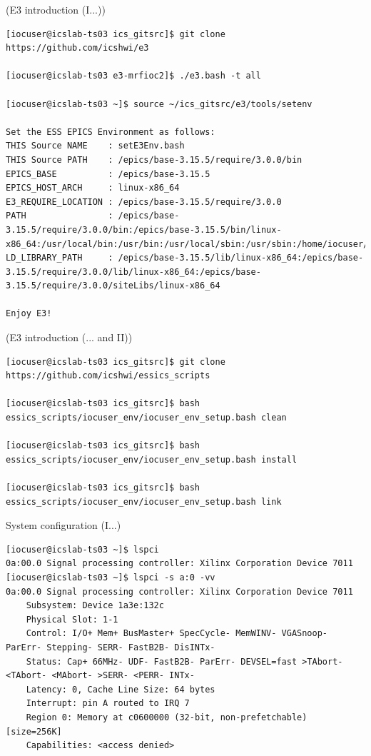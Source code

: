 \documentclass[
  9pt
  , table
  , ignorenonframetext
]{beamer}
\begin{document}
\begin{frame}[fragile]{(E3 introduction (I...))}
\begin{lstlisting}[style=termstyle,breaklines=true,basicstyle=\scriptsize]
[iocuser@icslab-ts03 ics_gitsrc]$ git clone https://github.com/icshwi/e3

[iocuser@icslab-ts03 e3-mrfioc2]$ ./e3.bash -t all

[iocuser@icslab-ts03 ~]$ source ~/ics_gitsrc/e3/tools/setenv

Set the ESS EPICS Environment as follows:
THIS Source NAME    : setE3Env.bash
THIS Source PATH    : /epics/base-3.15.5/require/3.0.0/bin
EPICS_BASE          : /epics/base-3.15.5
EPICS_HOST_ARCH     : linux-x86_64
E3_REQUIRE_LOCATION : /epics/base-3.15.5/require/3.0.0
PATH                : /epics/base-3.15.5/require/3.0.0/bin:/epics/base-3.15.5/bin/linux-x86_64:/usr/local/bin:/usr/bin:/usr/local/sbin:/usr/sbin:/home/iocuser/.local/bin:/home/iocuser/bin
LD_LIBRARY_PATH     : /epics/base-3.15.5/lib/linux-x86_64:/epics/base-3.15.5/require/3.0.0/lib/linux-x86_64:/epics/base-3.15.5/require/3.0.0/siteLibs/linux-x86_64

Enjoy E3!
\end{lstlisting}
\end{frame}

\begin{frame}[fragile]{(E3 introduction (... and II))}
\begin{lstlisting}[style=termstyle,breaklines=true,basicstyle=\footnotesize]
[iocuser@icslab-ts03 ics_gitsrc]$ git clone https://github.com/icshwi/essics_scripts

[iocuser@icslab-ts03 ics_gitsrc]$ bash essics_scripts/iocuser_env/iocuser_env_setup.bash clean

[iocuser@icslab-ts03 ics_gitsrc]$ bash  essics_scripts/iocuser_env/iocuser_env_setup.bash install

[iocuser@icslab-ts03 ics_gitsrc]$ bash  essics_scripts/iocuser_env/iocuser_env_setup.bash link

\end{lstlisting}
\end{frame}

\begin{frame}[fragile]{System configuration (I...)}
\begin{lstlisting}[style=termstyle,breaklines=true,basicstyle=\scriptsize]
[iocuser@icslab-ts03 ~]$ lspci
0a:00.0 Signal processing controller: Xilinx Corporation Device 7011
[iocuser@icslab-ts03 ~]$ lspci -s a:0 -vv
0a:00.0 Signal processing controller: Xilinx Corporation Device 7011
	Subsystem: Device 1a3e:132c
	Physical Slot: 1-1
	Control: I/O+ Mem+ BusMaster+ SpecCycle- MemWINV- VGASnoop- ParErr- Stepping- SERR- FastB2B- DisINTx-
	Status: Cap+ 66MHz- UDF- FastB2B- ParErr- DEVSEL=fast >TAbort- <TAbort- <MAbort- >SERR- <PERR- INTx-
	Latency: 0, Cache Line Size: 64 bytes
	Interrupt: pin A routed to IRQ 7
	Region 0: Memory at c0600000 (32-bit, non-prefetchable) [size=256K]
	Capabilities: <access denied>

\end{lstlisting}
\end{frame}
\end{document}
